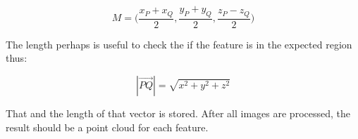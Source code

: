 \begin{equation}
    M = \big( \frac{x_P + x_Q}{2}, \frac{y_P + y_Q}{2}, \frac{z_P - z_Q}{2} \big)
\end{equation}

The length perhaps is useful to check the if the feature is in the expected region thus:

\begin{equation}
    |\overrightarrow{PQ}| = \sqrt{x^2 + y^2 + z^2}
\end{equation}

That and the length of that vector is stored.
After all images are processed, the result should be a point cloud for each feature.

